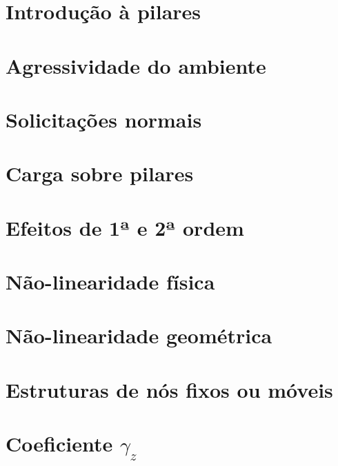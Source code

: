 \documentclass[12pt, a4paper]{article}
\begin{document}
	

	\section{Introdução à pilares}
	

	\section{Agressividade do ambiente}
	

	\section{Solicitações normais}
	

	\section{Carga sobre pilares}
	

	\section{Efeitos de 1ª e 2ª ordem}
	

	\section{Não-linearidade física}
	

	\section{Não-linearidade geométrica}
	

	\section{Estruturas de nós fixos ou móveis}
	

	\section{Coeficiente $\gamma_z$}
	
\end{document}
